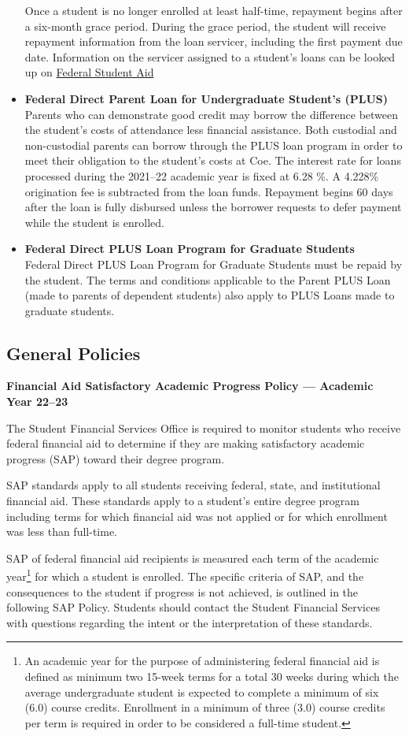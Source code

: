 \documentclass[
  letterpaper,
]{scrbook}
\begin{document}
\begin{itemize}
  Once a student is no longer enrolled at least half-time, repayment
  begins after a six-month grace period. During the grace period, the
  student will receive repayment information from the loan servicer,
  including the first payment due date. Information on the servicer
  assigned to a student's loans can be looked up on
  \href{studentaid.gov.}{Federal Student Aid}
\item
  \textbf{Federal Direct Parent Loan for Undergraduate Student's (PLUS)}
  Parents who can demonstrate good credit may borrow the difference
  between the student's costs of attendance less financial assistance.
  Both custodial and non-custodial parents can borrow through the PLUS
  loan program in order to meet their obligation to the student's costs
  at Coe. The interest rate for loans processed during the 2021--22
  academic year is fixed at 6.28 \%. A 4.228\% origination fee is
  subtracted from the loan funds. Repayment begins 60 days after the
  loan is fully disbursed unless the borrower requests to defer payment
  while the student is enrolled.
\item
  \textbf{Federal Direct PLUS Loan Program for Graduate Students}\\
  Federal Direct PLUS Loan Program for Graduate Students must be repaid
  by the student. The terms and conditions applicable to the Parent PLUS
  Loan (made to parents of dependent students) also apply to PLUS Loans
  made to graduate students.
\end{itemize}

\subsection{General
Policies}\label{sec-financial-aid-satisfactory-academic-progress-policy}

\textbf{Financial Aid Satisfactory Academic Progress Policy --- Academic
Year 22--23}

The Student Financial Services Office is required to monitor students
who receive federal financial aid to determine if they are making
satisfactory academic progress (SAP) toward their degree program.

SAP standards apply to all students receiving federal, state, and
institutional financial aid. These standards apply to a student's entire
degree program including terms for which financial aid was not applied
or for which enrollment was less than full-time.

SAP of federal financial aid recipients is measured each term of the
academic year\footnote{An academic year for the purpose of administering
  federal financial aid is defined as minimum two 15-week terms for a
  total 30 weeks during which the average undergraduate student is
  expected to complete a minimum of six (6.0) course credits. Enrollment
  in a minimum of three (3.0) course credits per term is required in
  order to be considered a full-time student.} for which a student is
enrolled. The specific criteria of SAP, and the consequences to the
student if progress is not achieved, is outlined in the following SAP
Policy. Students should contact the Student Financial Services with
questions regarding the intent or the interpretation of these standards.
\end{document}
